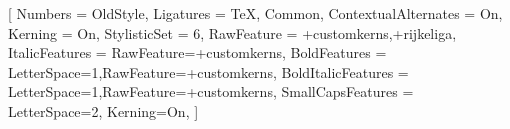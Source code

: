 \setmainfont{KpRoman}[
  Numbers = OldStyle,
  Ligatures = {TeX, Common},
  ContextualAlternates = On,
  Kerning = On,
  StylisticSet = {6},
  RawFeature = {+customkerns,+rijkeliga},
  ItalicFeatures = {RawFeature={+customkerns}},
  BoldFeatures = {LetterSpace=1,RawFeature={+customkerns}},
  BoldItalicFeatures = {LetterSpace=1,RawFeature={+customkerns}},
  SmallCapsFeatures = {LetterSpace=2, Kerning=On},
]
\setsansfont{KpSans}
\setmonofont{KpMono}

\linespread{1.06}

\newcommand{\VersionFontName}{Kp-fonts}






